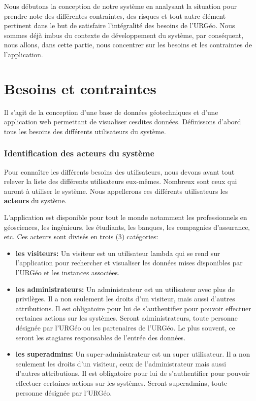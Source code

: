 Nous débutons la conception de notre système en analysant la
situation pour prendre note des différentes contraintes, des risques
et tout autre élément pertinent dans le but de satisfaire l'intégralité
des besoins de l'URGéo.  Nous sommes déjà imbus du contexte de développement
du système, par conséquent, nous allons, dans cette partie, nous concentrer
sur les besoins et les contraintes de l'application.
\section{Besoins et contraintes}
        Il s'agit de la conception d'une base de données géotechniques et d'une
        application web permettant de visualiser cesdites données. Définissons
        d'abord tous les besoins des différents utilisateurs du système.
        \subsubsection{Identification des acteurs du système}
        Pour connaître les différents besoins des utilisateurs, nous devons
        avant tout relever la liste des différents utilisateurs eux-mêmes.
        Nombreux sont ceux qui auront à utiliser le système. Nous appellerons ces différents
        utilisateurs  les \textbf{acteurs} du système.
        \par
        L'application est disponible pour tout le monde notamment les
        professionnels en géosciences, les ingénieurs, les étudiants, les banques, les 
        compagnies d'assurance, etc.
        Ces acteurs sont divisés en trois (3) catégories:
        \begin{itemize} 
                \item \textbf{les visiteurs: }
                Un visiteur est un utilisateur lambda qui se rend sur l'application pour rechercher et visualiser
                les données mises disponibles par l'URGéo et les instances associées. 
              
                \item \textbf{les administrateurs: }
                Un administrateur est un utilisateur avec plus de privilèges. Il a non seulement les droits d'un visiteur,
                mais aussi d'autres attributions. Il est obligatoire pour lui de s'authentifier pour pouvoir 
                effectuer certaines actions sur les systèmes. Seront administrateurs, toute personne désignée par l'URGéo
                ou les partenaires de l'URGéo. Le plus souvent, ce seront les stagiares responsables de l'entrée des données.

                \item \textbf{les superadmins: }
                Un super-administrateur est un super utilisateur. Il a non seulement les droits d'un visiteur,
                ceux de l'administrateur mais aussi d'autres attributions. Il est obligatoire pour lui de s'authentifier pour pouvoir 
                effectuer certaines actions sur les systèmes. Seront superadmins, toute personne désignée par l'URGéo.
            \end{itemize}   
